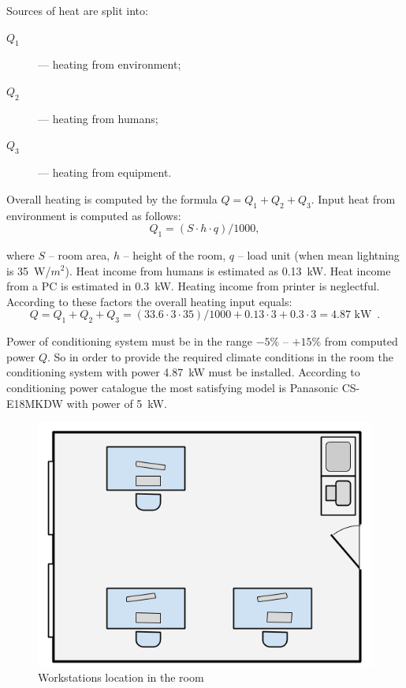 Sources of heat are split into:
\begin{description}
    \item[$Q_1$] --- heating from environment;
    \item[$Q_2$] --- heating from humans;
    \item[$Q_3$] --- heating from equipment.
\end{description}
Overall heating is computed by the formula $Q = Q_1 + Q_2 + Q_3$. Input heat
from environment is computed as follows:
\begin{equation}
Q_1 = (S \cdot h \cdot q) / 1000,
\end{equation}

where $S$ -- room area, $h$ -- height of the room, $q$ -- load unit (when mean
lightning is 35~W/$m^2$). Heat income from humans is estimated as 0.13~kW. Heat
income from a PC is estimated in 0.3~kW. Heating income from printer is
neglectful. According to these factors the overall heating input equals:
\begin{equation}
Q = Q_1 + Q_2 + Q_3 = (33.6 \cdot 3 \cdot 35) / 1000 + 0.13 \cdot 3 + 0.3 \cdot
3 = 4.87\text{~kW}\enspace.
\end{equation}

Power of conditioning system must be in the range $-5\%$ -- $+15\%$ from
computed power $Q$. So in order to provide the required climate conditions in
the room the conditioning system with power 4.87~kW must be installed. According
to conditioning power catalogue the most satisfying model is Panasonic
CS-E18MKDW with power of 5~kW.

\begin{figure}[htbp]
    \centering
    \includegraphics[scale=0.5]{images/workstation}
    \caption{Workstations location in the room}
    \label{fig:workstation}
\end{figure}

